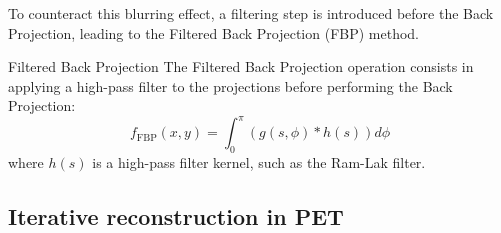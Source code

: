 To counteract this blurring effect, a filtering step is introduced before the Back Projection, leading to the Filtered Back Projection (FBP) method.

\begin{definition}{Filtered Back Projection}
    The Filtered Back Projection operation consists in applying a high-pass filter to the projections before performing the Back Projection:
    \begin{equation}
        f_{\text{FBP}}(x, y) = \int_{0}^{\pi} \left( g(s, \phi) * h(s) \right) d\phi
    \end{equation}
    where $h(s)$ is a high-pass filter kernel, such as the Ram-Lak filter.
\end{definition}

\subsection{Iterative reconstruction in PET}





